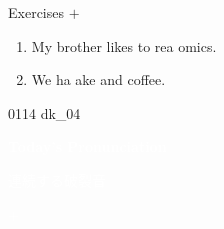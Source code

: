 \documentclass[aspectratio=169,xcolor={dvipsnames,table}]{beamer}
\begin{document}
\begin{frame}[plain]{Exercises  $+$ }
  \Large
  \begin{enumerate}
    \item<2-> My brother likes to rea  omics.
    \item<4-> We ha  ake and coffee.
  \end{enumerate}


  \hfill{\tiny 0114}\,{\scriptsize {}\,dk\_04}

\end{frame}
\begin{frame}
  \hypertarget{today}{}
  \centering
  \textcolor{white}{\Huge\bfseries Today's Pronunciation}

  \vspace{30pt}

  \textcolor{white}{\Large 連続する破裂音}

  \textcolor{white}{\Large {} $+$ }
\end{frame}
\end{document}
